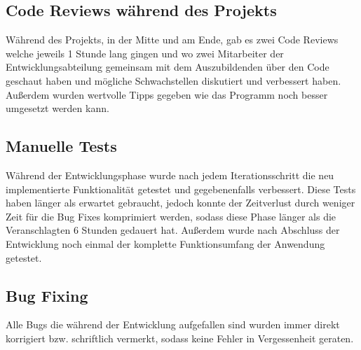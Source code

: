 \subsection{Code Reviews während des Projekts}
\label{Code Reviews während des Projekts}
Während des Projekts, in der Mitte und am Ende, gab es zwei Code Reviews welche jeweils 1 Stunde lang gingen und wo zwei Mitarbeiter der Entwicklungsabteilung gemeinsam mit dem Auszubildenden über den Code geschaut haben und mögliche Schwachstellen diskutiert und verbessert haben. Außerdem wurden wertvolle Tipps gegeben wie das Programm noch besser umgesetzt werden kann.    

\subsection{Manuelle Tests}
\label{Manuelle Tests}
Während der Entwicklungsphase wurde nach jedem Iterationsschritt die neu implementierte Funktionalität getestet und gegebenenfalls verbessert. Diese Tests haben länger als erwartet gebraucht, jedoch konnte der Zeitverlust durch weniger Zeit für die Bug Fixes komprimiert werden, sodass diese Phase länger als die Veranschlagten 6 Stunden gedauert hat. Außerdem wurde nach Abschluss der Entwicklung noch einmal der komplette Funktionsumfang der Anwendung getestet. 

\subsection{Bug Fixing}
\label{Bug Fixing}
Alle Bugs die während der Entwicklung aufgefallen sind wurden immer direkt korrigiert bzw. schriftlich vermerkt, sodass keine Fehler in Vergessenheit geraten.